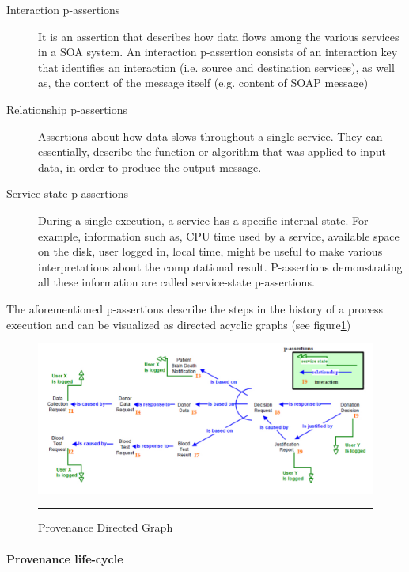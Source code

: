 \begin{description}
  \item[Interaction p-assertions]
         It is an assertion that describes how data flows among the various services in a SOA system. An interaction p-assertion consists of an interaction key that identifies an interaction (i.e. source and destination services), as well as, the content of the message itself (e.g. content of SOAP message)
  \item[ Relationship p-assertions]
      Assertions about how data slows throughout a single service. They can essentially, describe the function or algorithm that was applied to input data, in order to produce the output message.

  \item[Service-state p-assertions]
        During a single execution, a service has a specific internal state. For example, information such as, CPU time used by a service, available space on the disk, user logged in, local time, might be useful to make various interpretations about the computational result.  P-assertions demonstrating all these information are called service-state p-assertions.
\end{description}

The aforementioned p-assertions describe the steps in the history of a process execution and can be visualized as directed acyclic graphs (see figure\ref{fig:provGraph})

\begin{figure}[htbp]
	\centering
		\includegraphics[scale=0.35]{./Figures/chapter2/figure4.pdf}
		\rule{35em}{0.5pt}
	\caption[Provenance Directed Graph]{Provenance Directed Graph\cite{reference9}}
	\label{fig:provGraph}
\end{figure}


\paragraph{Provenance life-cycle}

